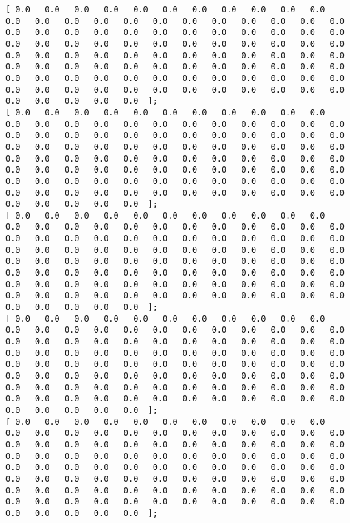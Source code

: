 \documentclass[11pt]{article}
\begin{document}
\begin{Verbatim}[commandchars=\\\{\}]
[ 0.0   0.0   0.0   0.0   0.0   0.0   0.0   0.0   0.0   0.0   0.0   0.0   0.0   0.0   0.0   0.0   0.0   0.0   0.0   0.0   0.0   0.0   0.0   0.0   0.0   0.0   0.0   0.0   0.0   0.0   0.0   0.0   0.0   0.0   0.0   0.0   0.0   0.0   0.0   0.0   0.0   0.0   0.0   0.0   0.0   0.0   0.0   0.0   0.0   0.0   0.0   0.0   0.0   0.0   0.0   0.0   0.0   0.0   0.0   0.0   0.0   0.0   0.0   0.0   0.0   0.0   0.0   0.0   0.0   0.0   0.0   0.0   0.0   0.0   0.0   0.0   0.0   0.0   0.0   0.0   0.0   0.0   0.0   0.0   0.0   0.0   0.0   0.0   0.0   0.0   0.0   0.0   0.0   0.0   0.0   0.0   0.0   0.0   0.0   0.0  ];
[ 0.0   0.0   0.0   0.0   0.0   0.0   0.0   0.0   0.0   0.0   0.0   0.0   0.0   0.0   0.0   0.0   0.0   0.0   0.0   0.0   0.0   0.0   0.0   0.0   0.0   0.0   0.0   0.0   0.0   0.0   0.0   0.0   0.0   0.0   0.0   0.0   0.0   0.0   0.0   0.0   0.0   0.0   0.0   0.0   0.0   0.0   0.0   0.0   0.0   0.0   0.0   0.0   0.0   0.0   0.0   0.0   0.0   0.0   0.0   0.0   0.0   0.0   0.0   0.0   0.0   0.0   0.0   0.0   0.0   0.0   0.0   0.0   0.0   0.0   0.0   0.0   0.0   0.0   0.0   0.0   0.0   0.0   0.0   0.0   0.0   0.0   0.0   0.0   0.0   0.0   0.0   0.0   0.0   0.0   0.0   0.0   0.0   0.0   0.0   0.0  ];
[ 0.0   0.0   0.0   0.0   0.0   0.0   0.0   0.0   0.0   0.0   0.0   0.0   0.0   0.0   0.0   0.0   0.0   0.0   0.0   0.0   0.0   0.0   0.0   0.0   0.0   0.0   0.0   0.0   0.0   0.0   0.0   0.0   0.0   0.0   0.0   0.0   0.0   0.0   0.0   0.0   0.0   0.0   0.0   0.0   0.0   0.0   0.0   0.0   0.0   0.0   0.0   0.0   0.0   0.0   0.0   0.0   0.0   0.0   0.0   0.0   0.0   0.0   0.0   0.0   0.0   0.0   0.0   0.0   0.0   0.0   0.0   0.0   0.0   0.0   0.0   0.0   0.0   0.0   0.0   0.0   0.0   0.0   0.0   0.0   0.0   0.0   0.0   0.0   0.0   0.0   0.0   0.0   0.0   0.0   0.0   0.0   0.0   0.0   0.0   0.0  ];
[ 0.0   0.0   0.0   0.0   0.0   0.0   0.0   0.0   0.0   0.0   0.0   0.0   0.0   0.0   0.0   0.0   0.0   0.0   0.0   0.0   0.0   0.0   0.0   0.0   0.0   0.0   0.0   0.0   0.0   0.0   0.0   0.0   0.0   0.0   0.0   0.0   0.0   0.0   0.0   0.0   0.0   0.0   0.0   0.0   0.0   0.0   0.0   0.0   0.0   0.0   0.0   0.0   0.0   0.0   0.0   0.0   0.0   0.0   0.0   0.0   0.0   0.0   0.0   0.0   0.0   0.0   0.0   0.0   0.0   0.0   0.0   0.0   0.0   0.0   0.0   0.0   0.0   0.0   0.0   0.0   0.0   0.0   0.0   0.0   0.0   0.0   0.0   0.0   0.0   0.0   0.0   0.0   0.0   0.0   0.0   0.0   0.0   0.0   0.0   0.0  ];
[ 0.0   0.0   0.0   0.0   0.0   0.0   0.0   0.0   0.0   0.0   0.0   0.0   0.0   0.0   0.0   0.0   0.0   0.0   0.0   0.0   0.0   0.0   0.0   0.0   0.0   0.0   0.0   0.0   0.0   0.0   0.0   0.0   0.0   0.0   0.0   0.0   0.0   0.0   0.0   0.0   0.0   0.0   0.0   0.0   0.0   0.0   0.0   0.0   0.0   0.0   0.0   0.0   0.0   0.0   0.0   0.0   0.0   0.0   0.0   0.0   0.0   0.0   0.0   0.0   0.0   0.0   0.0   0.0   0.0   0.0   0.0   0.0   0.0   0.0   0.0   0.0   0.0   0.0   0.0   0.0   0.0   0.0   0.0   0.0   0.0   0.0   0.0   0.0   0.0   0.0   0.0   0.0   0.0   0.0   0.0   0.0   0.0   0.0   0.0   0.0  ];

\end{Verbatim}
\end{document}
